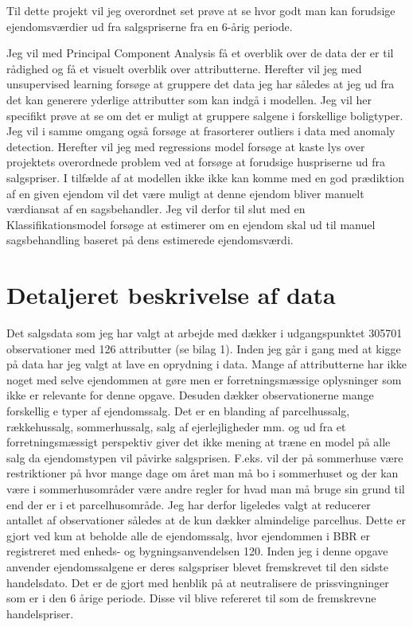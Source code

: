 \documentclass{report}
\begin{document}
Til dette projekt vil jeg overordnet set prøve at se hvor godt man kan forudsige ejendomsværdier 
ud fra salgspriserne fra en 6-årig periode. 

Jeg vil med Principal Component Analysis få et overblik over de data der er til rådighed og få et
visuelt overblik over attributterne. 
Herefter vil jeg med unsupervised learning forsøge at gruppere det data jeg har således at jeg ud
fra det kan generere yderlige attributter som kan indgå i modellen. Jeg vil her specifikt prøve at
se om det er muligt at gruppere salgene i forskellige boligtyper. Jeg vil i samme omgang også
forsøge at frasorterer outliers i data med anomaly detection. 
Herefter vil jeg med regressions model forsøge at kaste lys over projektets overordnede problem ved
at forsøge at forudsige huspriserne ud fra salgspriser. I tilfælde af at modellen ikke ikke kan
komme med en god prædiktion af en given ejendom vil det være muligt at denne ejendom bliver manuelt
værdiansat af en sagsbehandler. Jeg vil derfor til slut med en Klassifikationsmodel forsøge at
estimerer om en ejendom skal ud til manuel sagsbehandling baseret på dens estimerede ejendomsværdi.

\section{Detaljeret beskrivelse af data}

Det salgsdata som jeg har valgt at arbejde med dækker i udgangspunktet 305701 observationer med 126
attributter (se bilag 1). Inden jeg går i gang med at kigge på data har jeg valgt at lave en oprydning i data.
Mange af attributterne har ikke noget med selve ejendommen at gøre men er forretningsmæssige
oplysninger som ikke er relevante for denne opgave. Desuden dækker observationerne mange forskellig
e typer af ejendomssalg. Det er en blanding af parcelhussalg, rækkehussalg, sommerhussalg, salg af
ejerlejligheder mm. og ud fra et forretningsmæssigt perspektiv giver det ikke mening at træne en
model på alle salg da ejendomstypen vil påvirke salgsprisen. F.eks. vil der på sommerhuse være
restriktioner på hvor mange dage om året man må bo i sommerhuset og der kan være i sommerhusområder
være andre regler for hvad man må bruge sin grund til end der er i et parcelhusområde. Jeg har
derfor ligeledes valgt at reducerer antallet af observationer således at de kun dækker almindelige
parcelhus. Dette er gjort ved kun at beholde alle de ejendomssalg, hvor ejendommen i BBR er
registreret med enheds- og bygningsanvendelsen 120. 
Inden jeg i denne opgave anvender ejendomssalgene er deres salgspriser blevet fremskrevet til den
sidste handelsdato. Det er de gjort med henblik på at neutralisere de prissvingninger som er i den
6 årige periode. Disse vil blive refereret til som de fremskrevne handelspriser. 
\end{document}
